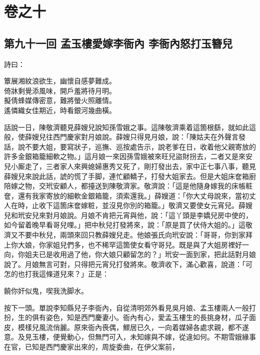 \part*{{\titlename}卷之十}



\chapter*{第九十一回 孟玉樓愛嫁李衙內 李衙內怒打玉簪兒}


詩曰：

\begin{myquote}
簟展湘紋浪欲生，幽懷自感夢難成。\\倚牀剩覺添風味，開戶羞將待月明。\\擬倩蜂媒傳密意，難將螢火照離情。\\遙憐織女佳期近，時看銀河幾曲橫。
\end{myquote}

話說一日，陳敬濟聽見薛嫂兒說知孫雪娥之事。這陳敬濟乘着這箇根繇，就如此這般，使薛嫂兒往西門慶家對月娘說。薛嫂只得見月娘，說：「陳姑夫在外聲言發話，說不要大姐，要寫狀子，巡撫、巡按處告示，說老爹在日，收着他父親寄放的許多金銀箱籠細軟之物。」{}這月娘一來因孫雪娥被來旺兒盜財拐去，二者又是來安兒小厮走了，三者家人來興媳婦惠秀又死了，剛打發出去，家中正七事八事，聽見薛嫂兒來說此話，諕的慌了手脚，連忙顧轎子，打發大姐家去。但是大姐床奩箱廚陪嫁之物，交玳安顧人，都擡送到陳敬濟家。敬濟說：「這是他隨身嫁我的床帳粧奩，還有我家寄放的細軟金銀箱籠，須索還我。」薛嫂道：「你大丈母說來，當初丈人在時，止收下這箇床奩嫁粧，並沒見你別的箱籠。」敬濟又要使女元宵兒。薛嫂兒和玳安兒來對月娘說。月娘不肯把元宵與他，說：「這丫頭是李嬌兒房中使的，如今留着晚早看哥兒哩。」把中秋兒打發將來，說：「原是買了伏侍大姐的。」這敬濟又不要中秋兒，兩頭來回只教薛嫂兒走。他娘張氏向玳安說：「哥哥，你到家拜上你大娘，你家姐兒們多，也不稀罕這箇使女看守哥兒。既是與了大姐房裡好一向，你姐夫已是收用過了他，你大娘只顧留怎的？」玳安一面到家，把此話對月娘說了。月娘無言可對，只得把元宵兒打發將來。敬濟收下，滿心歡喜，說道：「可怎的也打我這條道兒來？」正是：

\begin{myquote}
饒你奸似鬼，喫我洗脚水。
\end{myquote}

按下一頭。單說李知縣兒子李衙內，自從清明郊外看見吳月娘、孟玉樓兩人一般打扮，生的俱有姿色，知是西門慶妻小。衙內有心，愛孟玉樓生的長挑身材，瓜子面皮，模樣兒風流俏麗。原來衙內䘮偶，鰥居已久，一向着媒婦各處求親，都不遂意。及見玉樓，便覺動心，但無門可入，未知嫁與不嫁，從違如何。不期雪娥緣事在官，已知是西門慶家出來的，周旋委曲，在伊父案前，

